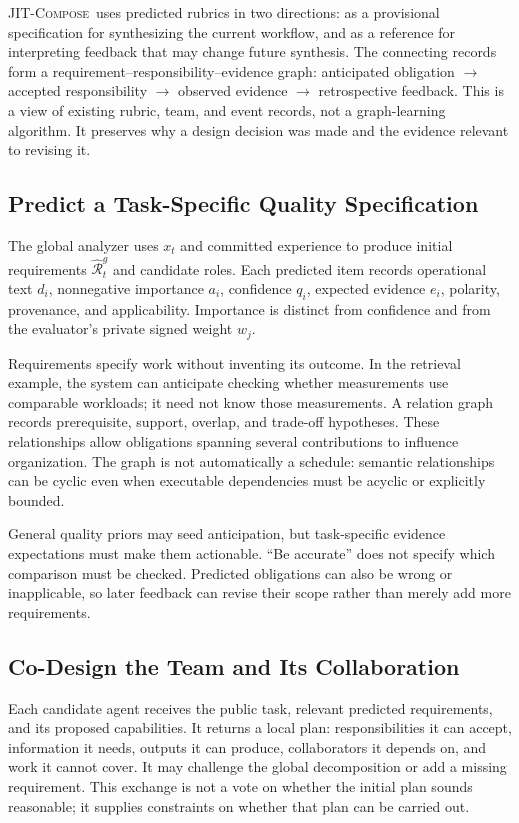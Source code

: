 \documentclass[11pt]{article}
\newcommand{\method}{\mbox{\textsc{JIT-Compose}}}
\newcommand{\rub}{\widehat{\mathcal{R}}}
\begin{document}
\method\ uses predicted rubrics in two directions: as a provisional specification for synthesizing the current workflow, and as a reference for interpreting feedback that may change future synthesis. The connecting records form a requirement--responsibility--evidence graph: anticipated obligation $\rightarrow$ accepted responsibility $\rightarrow$ observed evidence $\rightarrow$ retrospective feedback. This is a view of existing rubric, team, and event records, not a graph-learning algorithm. It preserves why a design decision was made and the evidence relevant to revising it.

\subsection{Predict a Task-Specific Quality Specification}
\label{sec:anticipate}

The global analyzer uses $x_t$ and committed experience to produce initial requirements $\rub_t^g$ and candidate roles. Each predicted item records operational text $d_i$, nonnegative importance $a_i$, confidence $q_i$, expected evidence $e_i$, polarity, provenance, and applicability. Importance is distinct from confidence and from the evaluator's private signed weight $w_j$.

Requirements specify work without inventing its outcome. In the retrieval example, the system can anticipate checking whether measurements use comparable workloads; it need not know those measurements. A relation graph records prerequisite, support, overlap, and trade-off hypotheses. These relationships allow obligations spanning several contributions to influence organization. The graph is not automatically a schedule: semantic relationships can be cyclic even when executable dependencies must be acyclic or explicitly bounded.

General quality priors may seed anticipation, but task-specific evidence expectations must make them actionable. ``Be accurate'' does not specify which comparison must be checked. Predicted obligations can also be wrong or inapplicable, so later feedback can revise their scope rather than merely add more requirements.

\subsection{Co-Design the Team and Its Collaboration}
\label{sec:negotiate}

Each candidate agent receives the public task, relevant predicted requirements, and its proposed capabilities. It returns a local plan: responsibilities it can accept, information it needs, outputs it can produce, collaborators it depends on, and work it cannot cover. It may challenge the global decomposition or add a missing requirement. This exchange is not a vote on whether the initial plan sounds reasonable; it supplies constraints on whether that plan can be carried out.
\end{document}
